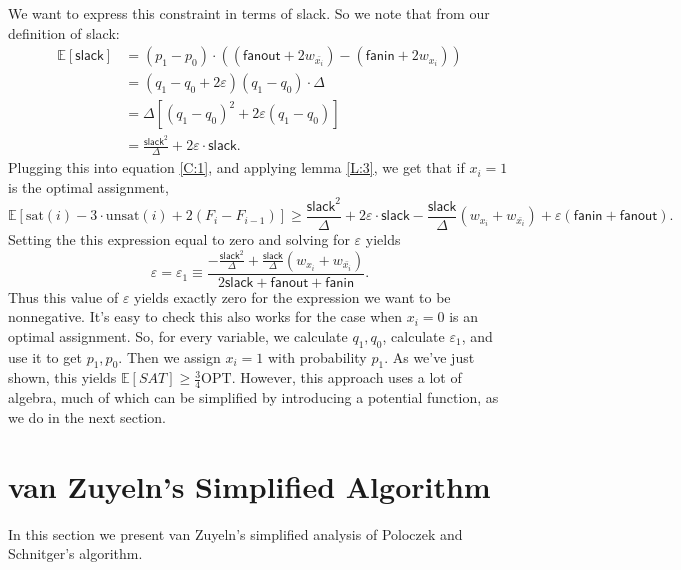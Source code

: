 \documentclass[11pt,letter]{article}
\numberwithin{theorem}{section}
\renewcommand{\epsilon}{\varepsilon}
\begin{document}
We want to express this constraint in terms of slack. So we note that from our definition of slack:
\begin{align*}
\mathbb{E}[\mathsf{slack}] &= (p_1-p_0)\cdot ((\mathsf{fanout} + 2w_{\bar{x_i}}) -(\mathsf{fanin} + 2w_{x_i}))
\\ &= (q_1-q_0+2\epsilon)(q_1-q_0)\cdot\Delta
\\ &= \Delta[(q_1-q_0)^2 + 2\varepsilon(q_1-q_0)]
\\ &= \frac{\mathsf{slack}^2}{\Delta} +2\varepsilon\cdot\mathsf{slack}.
\end{align*}
Plugging this into equation \ref{C:1}, and applying lemma \ref{L:3}, we get that if $x_i =1$ is the optimal assignment,
\[\mathbb{E}[\textrm{sat}(i) - 3\cdot\textrm{unsat}(i)+ 2(F_{i}-F_{i-1})] \ge \frac{\mathsf{slack}^2}{\Delta} +2\varepsilon\cdot\mathsf{slack} - \frac{\mathsf{slack}}{\Delta}(w_{x_i} + w_{\bar{x_i}}) + \varepsilon(\mathsf{fanin} + \mathsf{fanout}).\]
Setting the this expression equal to zero and solving for $\varepsilon$ yields
\begin{equation}
\varepsilon = \varepsilon_1 \equiv \frac{-\frac{\mathsf{slack}^2}{\Delta} + \frac{\mathsf{slack}}{\Delta}(w_{x_i} + w_{\bar{x_i}})}{2\mathsf{slack}+ \mathsf{fanout} + \mathsf{fanin}}.
\end{equation}
Thus this value of $\varepsilon$ yields exactly zero for the expression we want to be nonnegative. It's easy to check this also works for the case when $x_i=0$ is an optimal assignment. So, for every variable, we calculate $q_1, q_0$, calculate $\varepsilon_1$, and use it to get $p_1, p_0$. Then we assign $x_i=1$ with probability $p_1$. As we've just shown, this yields $\mathbb{E}[SAT] \ge \frac{3}{4}\textrm{OPT}$. However, this approach uses a lot of algebra, much of which can be simplified by introducing a potential function, as we do in the next section.

\section{van Zuyeln's Simplified Algorithm}\label{S:vZ}

In this section we present van Zuyeln's simplified analysis of Poloczek and Schnitger's algorithm.
\end{document}
